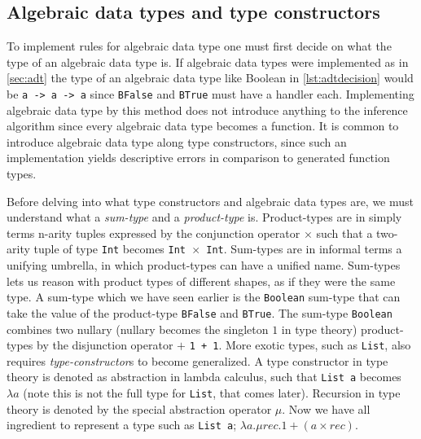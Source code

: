 \subsection{Algebraic data types and type constructors}
To implement rules for algebraic data type one must first decide on what the type of an algebraic data type is.
If algebraic data types were implemented as in \autoref{sec:adt} the type of an algebraic data type like Boolean in \autoref{lst:adtdecision} would be \texttt{a -> a -> a} since \texttt{BFalse} and \texttt{BTrue} must have a handler each.
Implementing algebraic data type by this method does not introduce anything to the inference algorithm since every algebraic data type becomes a function.
It is common to introduce algebraic data type along type constructors, since such an implementation yields descriptive errors in comparison to generated function types.

Before delving into what type constructors and algebraic data types are, we must understand what a \textit{sum-type} and a \textit{product-type} is.
Product-types are in simply terms n-arity tuples expressed by the conjunction operator $\times$ such that a two-arity tuple of type \texttt{Int} becomes \texttt{Int $\times$ Int}.
Sum-types are in informal terms a unifying umbrella, in which product-types can have a unified name.
Sum-types lets us reason with product types of different shapes, as if they were the same type.
A sum-type which we have seen earlier is the \texttt{Boolean} sum-type that can take the value of the product-type \texttt{BFalse} and \texttt{BTrue}.
The sum-type \texttt{Boolean} combines two nullary (nullary becomes the singleton $1$ in type theory) product-types by the disjunction operator $+$ \texttt{1 + 1}.
More exotic types, such as \texttt{List}, also requires \textit{type-constructor}s to become generalized.
A type constructor in type theory is denoted as abstraction in lambda calculus, such that \texttt{List a} becomes $\lambda a$ (note this is not the full type for \texttt{List}, that comes later).
Recursion in type theory is denoted by the special abstraction operator $\mu$.
Now we have all ingredient to represent a type such as \texttt{List a}; $\lambda a.\mu \textit{rec}.1 + (a \times \textit{rec})$.



